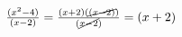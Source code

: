 \documentclass{article}
\begin{document}
$\frac{(x^2-4)}{(x-2)} = \frac{(x+2)(\cancel{(x-2)})}{(\cancel{x-2})} = (x+2)$
\end{document}
